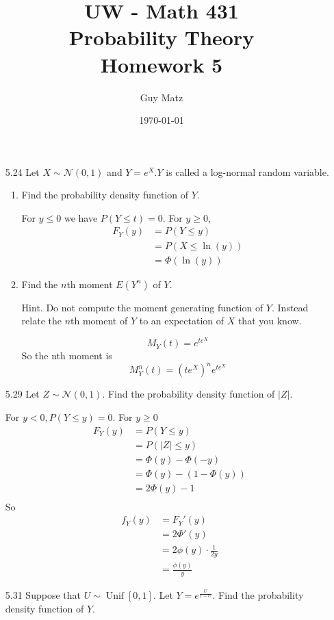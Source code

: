 \documentclass[10pt]{article}
\title{UW - Math 431 \\
Probability Theory \\
Homework 5}
\author{Guy Matz}
\date{\today}
\begin{document}
\maketitle

\begin{itemize}

	\item[5.24] Let $X \sim \mathcal{N}(0,1)$ and $Y=e^{X} . Y$ is called a log-normal random variable.

	\begin{enumerate}
		\item  Find the probability density function of $Y$.

			For $y \leq 0$ we have $P(Y \leq t) = 0$.  For $y \geq 0$,
			\begin{align*}
				F_Y(y) &= P(Y \leq y)\\
					&= P(X \leq \ln(y))\\
					&= \Phi(\ln(y))
			\end{align*}
		\item  Find the $n$th moment $E\left(Y^{n}\right)$ of $Y$.

Hint. Do not compute the moment generating function of $Y$. Instead relate the $n$th moment of $Y$ to an expectation of $X$ that you know.

	\[ M_Y(t) = e^{te^X} \]
	So the nth moment is
		\[ M^n_Y(t) = \left(t e^X \right)^n e^{te^X} \]
	\end{enumerate}
\newpage
	\item[5.29] Let $Z \sim \mathcal{N}(0,1)$. Find the probability density function of $|Z|$.

		For $y < 0, P(Y \leq y) =0$.  For $y \geq 0$
		\begin{align*}
			F_Y(y) &= P(Y \leq y) \\
					&= P(|Z| \leq y)\\
					&= \Phi(y) - \Phi(-y)\\
					&= \Phi(y) - (1 - \Phi(y))\\
					&= 2\Phi(y) - 1 \\
		\end{align*}
		So
		\begin{align*}
			f_Y(y) &= F_Y'(y) \\
					&= 2 \Phi'(y) \\
					&= 2 \phi(y) \cdot \frac{1}{2y}  \\
					&= \frac{\phi(y)}{y} 
		\end{align*}

\newpage
	\item[5.31] Suppose that $U \sim \operatorname{Unif}[0,1]$. Let $Y=e^{\frac{U}{1-U}}$. Find the probability density function of $Y$.


\end{itemize}
\end{document}
